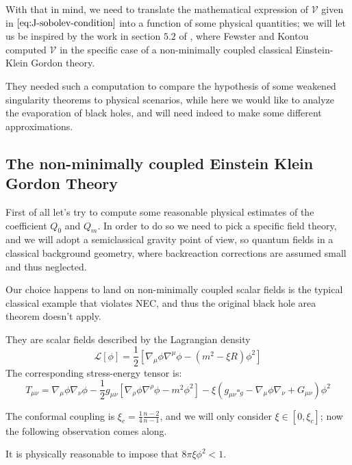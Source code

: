 With that in mind, we need to translate the mathematical expression of \(\mathcal{V}\) given in \(\eqref{eq:J-sobolev-condition}\) into a function of some physical quantities; we will let us be inspired by the work in section \(5.2\) of \cite*{fewster2020new}, where Fewster and Kontou computed \(\mathcal{V}\) in the specific case of a non-minimally coupled classical Einstein-Klein Gordon theory.

They needed such a computation to compare the hypothesis of some weakened singularity theorems to physical scenarios, while here we would like to analyze the evaporation of black holes, and will need indeed to make some different approximations.

\subsection{The non-minimally coupled Einstein Klein Gordon Theory}
\label{subsec:non-min-EKG-theory}
First of all let's try to compute some reasonable physical estimates of the coefficient \(Q_0\) and \(Q_m\). In order to do so we need to pick a specific field theory, and we will adopt a semiclassical gravity point of view, so quantum fields in a classical background geometry, where backreaction corrections are assumed small and thus neglected.

Our choice happens to land on non-minimally coupled scalar fields is the typical classical example that violates NEC, and thus the original black hole area theorem doesn't apply. 

They are scalar fields described by the Lagrangian density
\[
\mathcal{L}[\phi] = \frac{1}{2}\left[\nabla_{\mu}\phi\nabla^{\mu}\phi   - (m^2 - \xi R)\phi^2\right]
\]
The corresponding stress-energy tensor is:
\begin{equation}
    T_{\mu\nu} = \nabla_{\mu}\phi\nabla_{\nu}\phi - \frac{1}{2}g_{\mu\nu}\left[\nabla_{\rho}\phi\nabla^{\rho}\phi - m^2\phi^2\right] - \xi\left(g_{\mu\nu}\square_g - \nabla_{\mu}\phi\nabla_{\nu} + G_{\mu\nu}\right)\phi^2
\end{equation}

The conformal coupling is \(\xi_c = \frac{1}{4}\frac{n - 2}{n - 1}\), and we will only consider \(\xi\in [0,\xi_c]\); 
now the following observation comes along.

\begin{prop}
    It is physically reasonable to impose that \(8\pi\xi\phi^2 < 1\).
\end{prop}

